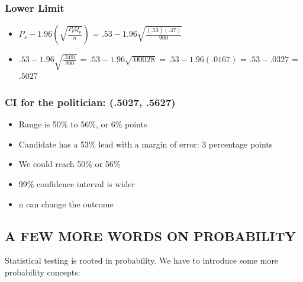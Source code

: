 \documentclass[]{article}
\begin{document}
\subsubsection{Lower Limit}\label{lower-limit}

\begin{itemize}
\itemsep1pt\parskip0pt
\item
  $P_s - 1.96(\sqrt{\frac{P_p Q_p}{n}})$ =
  $.53 -1.96 \sqrt{\frac{(.53)(.47)}{900}}$
\item
  $.53 - 1.96 \sqrt{\frac{.2491}{900}}$ = $.53 -1.96 \sqrt{.00028}$ =
  $.53 - 1.96(.0167)$ = $.53 - .0327$ = $.5027$
\end{itemize}

\subsubsection{CI for the politician: (.5027,
.5627)}\label{ci-for-the-politician-.5027-.5627}

\begin{itemize}
\itemsep1pt\parskip0pt
\item
  Range is 50\% to 56\%, or 6\% points
\item
  Candidate has a 53\% lead with a margin of error: 3 percentage points
\item
  We could reach 50\% or 56\%
\item
  99\% confidence interval is wider
\item
  n can change the outcome
\end{itemize}

\subsection{A FEW MORE WORDS ON
PROBABILITY}\label{a-few-more-words-on-probability}

Statistical testing is rooted in probability. We have to introduce some
more probability concepts:
\end{document}
